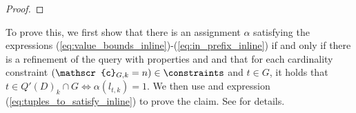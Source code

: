 \begin{proof}
\end{proof}
\else
To prove this, we first show that there is an assignment $\alpha$ satisfying the expressions (\ref{eq:value_bounds_inline})-(\ref{eq:in_prefix_inline}) if and only if there is a refinement of the query with properties  and 
  and that for each cardinality constraint $(\mathscr{c}_{G, k} = n) \in \constraints$ and $t \in G$, it holds that $t \in Q'(D)_k \cap G \iff \alpha(l_{t, k}) = 1$. We then use  and expression (\ref{eq:tuples_to_satisfy_inline}) to prove the claim. See \cite{Extended} for details.
  
\fi

